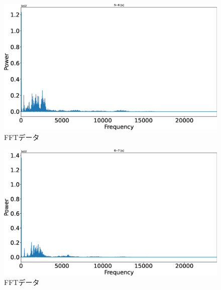 \documentclass[a4j,10pt]{jarticle}
\begin{document}
\begin{figure}[h]
  \begin{center}
    \includegraphics[width=1\textwidth]{5.eps}
    \caption{FFTデータ}
  \end{center}
\end{figure}

\begin{figure}[h]
  \begin{center}
    \includegraphics[width=1\textwidth]{6.eps}
    \caption{FFTデータ}
  \end{center}
\end{figure}


\end{document}
